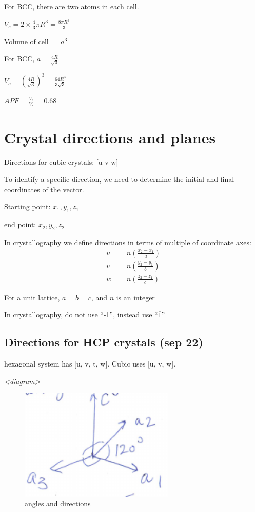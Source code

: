 \documentclass{article}
\begin{document}
For BCC, there are two atoms in each cell.

$V_s = 2\times\frac{4}{3} \pi R^3=\frac{8\pi R^3}{3}$

Volume of cell $=a^3$

For BCC, $a=\frac{4R}{\sqrt{3}}$

$V_c = \left(\frac{4R}{\sqrt{3}}\right)^3 = \frac{64R^3}{3\sqrt{3}}$

$APF = \frac{V_s}{V_c} = 0.68$

\section{Crystal directions and planes}

Directions for cubic crystals: [u v w]

To identify a specific direction, we need to determine the initial and final coordinates of the vector.

Starting point: $x_1, y_1, z_1$

end point: $x_2, y_2, z_2$

In crystallography we define directions in terms of multiple of coordinate axes:
\begin{align*}
    u&=n\left(\frac{x_2-x_1}{a}\right)\\
    v&=n\left(\frac{y_2-y_1}{b}\right)\\
    w&=n\left(\frac{z_2-z_1}{c}\right)
\end{align*}

For a unit lattice, $a=b=c$, and $n$ is an integer

In crystallography, do not use ``-1'', instead use ``$\overline{1}$''

\subsection{Directions for HCP crystals (sep 22)}
hexagonal system has [u, v, t, w]. Cubic uses [u, v, w].

\textit{\textless diagram\textgreater}

\begin{figure}[h!]
	\centering
	\includegraphics[width=0.66\textwidth]{assets/a6529061.png}
	\caption{angles and directions}
\end{figure}
\end{document}
